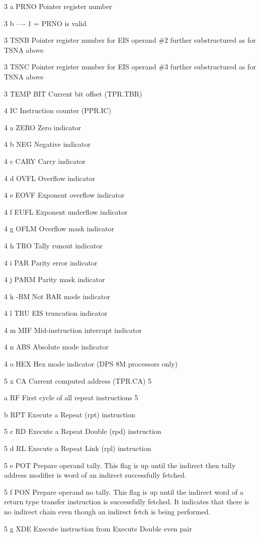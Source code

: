 3 a PRNO Pointer register number

3 b ---- 1 = PRNO is valid

3 TSNB Pointer register number for EIS operand \#2 further substructured as for
TSNA above

3 TSNC Pointer register number for EIS operand \#3 further substructured as for
TSNA above

3 TEMP BIT Current bit offset (TPR.TBR)

4 IC Instruction counter (PPR.IC)

4 a ZERO Zero indicator

4 b NEG Negative indicator

4 c CARY Carry indicator

4 d OVFL Overflow indicator

4 e EOVF Exponent overflow indicator

4 f EUFL Exponent underflow indicator

4 g OFLM Overflow mask indicator

4 h TRO Tally runout indicator

4 i PAR Parity error indicator

4 j PARM Parity mask indicator

4 k -BM Not BAR mode indicator

4 l TRU EIS truncation indicator

4 m MIF Mid-instruction interrupt indicator

4 n ABS Absolute mode indicator

4 o HEX Hex mode indicator (DPS 8M processors only)

5 x CA Current computed address (TPR.CA) 5

a RF First cycle of all repeat instructions 5

b RPT Execute a Repeat (rpt) instruction

5 c RD Execute a Repeat Double (rpd) instruction

5 d RL Execute a Repeat Link (rpl) instruction

5 e POT Prepare operand tally.  This flag is up until the indirect then tally
address modifier is word of an indirect successfully fetched.

5 f PON Prepare operand no tally. This flag is up until the indirect word of a
return type transfer instruction is successfully fetched. It indicates that
there is no indirect chain even though an indirect fetch is being performed.

5 g XDE Execute instruction from Execute Double even pair

